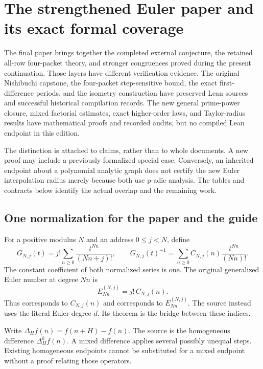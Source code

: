 \section{The strengthened Euler paper and its exact formal coverage}\label{sec:new-coverage}

The final paper brings together the completed external conjecture, the retained all-row four-packet theory, and stronger congruences proved during the present continuation. Those layers have different verification evidence. The original Nishibuchi capstone, the four-packet step-sensitive bound, the exact first-difference periods, and the isometry construction have preserved Lean sources and successful historical compilation records. The new general prime-power closure, mixed factorial estimates, exact higher-order laws, and Taylor-radius results have mathematical proofs and recorded audits, but no compiled Lean endpoint in this edition.

The distinction is attached to claims, rather than to whole documents. A new proof may include a previously formalized special case. Conversely, an inherited endpoint about a polynomial analytic graph does not certify the new Euler interpolation radius merely because both use p-adic analysis. The tables and contracts below identify the actual overlap and the remaining work.

\subsection{One normalization for the paper and the guide}
For a positive modulus $N$ and an address $0\le j<N$, define
\[
 G_{N,j}(t)=j!\sum_{n\ge0}\frac{t^{Nn}}{(Nn+j)!},\qquad
 G_{N,j}(t)^{-1}=\sum_{n\ge0}C_{N,j}(n)\frac{t^{Nn}}{(Nn)!}.
\]
The constant coefficient of both normalized series is one. The original generalized Euler number at degree $Nn$ is
\[
 E_{Nn}^{(N,j)}=j!\,C_{N,j}(n).
\]
Thus  corresponds to $C_{N,j}(n)$ and  corresponds to $E_{Nn}^{(N,j)}$. The source  instead uses the literal Euler degree $d$. Its theorem  is the bridge between these indices.

Write $\Delta_H f(n)=f(n+H)-f(n)$. The source  is the homogeneous difference $\Delta_H^k f(n)$. A mixed difference applies several possibly unequal steps. Existing homogeneous endpoints cannot be substituted for a mixed endpoint without a proof relating those operators.

